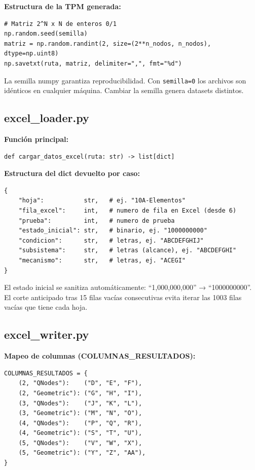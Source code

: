 \documentclass[12pt,a4paper]{article}
\begin{document}
\textbf{Estructura de la TPM generada:}
\begin{lstlisting}
# Matriz 2^N x N de enteros 0/1
np.random.seed(semilla)
matriz = np.random.randint(2, size=(2**n_nodos, n_nodos), dtype=np.uint8)
np.savetxt(ruta, matriz, delimiter=",", fmt="%d")
\end{lstlisting}

\begin{notebox}
La semilla numpy garantiza reproducibilidad. Con \texttt{semilla=0} los archivos son idénticos en cualquier máquina. Cambiar la semilla genera datasets distintos.
\end{notebox}

\subsection{excel\_loader.py}

\textbf{Función principal:}
\begin{lstlisting}
def cargar_datos_excel(ruta: str) -> list[dict]
\end{lstlisting}

\textbf{Estructura del dict devuelto por caso:}
\begin{lstlisting}
{
    "hoja":           str,   # ej. "10A-Elementos"
    "fila_excel":     int,   # numero de fila en Excel (desde 6)
    "prueba":         int,   # numero de prueba
    "estado_inicial": str,   # binario, ej. "1000000000"
    "condicion":      str,   # letras, ej. "ABCDEFGHIJ"
    "subsistema":     str,   # letras (alcance), ej. "ABCDEFGHI"
    "mecanismo":      str,   # letras, ej. "ACEGI"
}
\end{lstlisting}

\begin{notebox}
El estado inicial se sanitiza automáticamente: ``1,000,000,000'' → ``1000000000''. El corte anticipado tras 15 filas vacías consecutivas evita iterar las 1003 filas vacías que tiene cada hoja.
\end{notebox}

\subsection{excel\_writer.py}

\textbf{Mapeo de columnas (COLUMNAS\_RESULTADOS):}
\begin{lstlisting}
COLUMNAS_RESULTADOS = {
    (2, "QNodes"):    ("D", "E", "F"),
    (2, "Geometric"): ("G", "H", "I"),
    (3, "QNodes"):    ("J", "K", "L"),
    (3, "Geometric"): ("M", "N", "O"),
    (4, "QNodes"):    ("P", "Q", "R"),
    (4, "Geometric"): ("S", "T", "U"),
    (5, "QNodes"):    ("V", "W", "X"),
    (5, "Geometric"): ("Y", "Z", "AA"),
}
\end{lstlisting}
\end{document}

